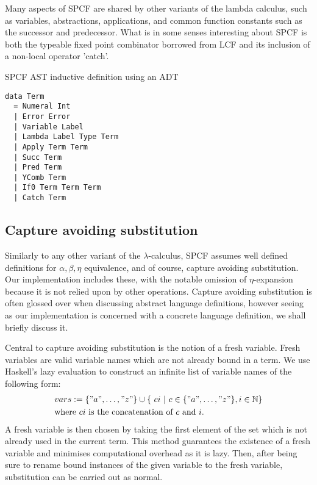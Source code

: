 \documentclass[12pt,a4paper]{report}
\theoremstyle{definition}
\theoremstyle{remark}
\begin{document}
Many aspects of SPCF are shared by other variants of the lambda calculus, such as variables, abstractions, applications, and common function constants such as the successor and predecessor. What is in some senses interesting about SPCF is both the typeable fixed point combinator borrowed from LCF and its inclusion of a non-local operator 'catch'. 

\begin{listing}
\caption{SPCF AST inductive definition using an ADT}
\begin{verbatim}
data Term
  = Numeral Int
  | Error Error
  | Variable Label
  | Lambda Label Type Term
  | Apply Term Term 
  | Succ Term
  | Pred Term
  | YComb Term
  | If0 Term Term Term
  | Catch Term
\end{verbatim}
\label{listing:spcf-ast}
\end{listing}

\subsection{Capture avoiding substitution}
Similarly to any other variant of the $\lambda$-calculus, SPCF assumes well defined definitions for $\alpha, \beta, \eta$ equivalence, and of course, capture avoiding substitution. Our implementation includes these, with the notable omission of $\eta$-expansion because it is not relied upon by other operations. Capture avoiding substitution is often glossed over when discussing abstract language definitions, however seeing as our implementation is concerned with a concrete language definition, we shall briefly discuss it.

Central to capture avoiding substitution is the notion of a fresh variable. Fresh variables are valid variable names which are not already bound in a term. We use Haskell's lazy evaluation to construct an infinite list of variable names of the following form: 
\[
\begin{split}
&vars := \{"a", \dots, "z"\} \cup \{\ ci\ |\ c \in \{"a", \dots, "z"\}, i \in \mathbb{N}\} \\
&\text{where $ci$ is the concatenation of $c$ and $i$.}
\end{split}
\]
A fresh variable is then chosen by taking the first element of the set which is not already used in the current term. This method guarantees the existence of a fresh variable and minimises computational overhead as it is lazy. Then, after being sure to rename bound instances of the given variable to the fresh variable, substitution can be carried out as normal.
\end{document}
